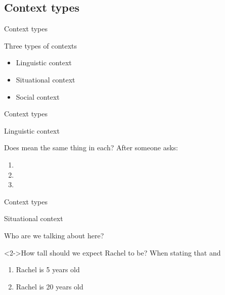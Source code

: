 \documentclass{beamer}
\newcommand{\subonethree}{Context types}
\begin{document}
    \subsection{\subonethree}
      \begin{frame}{\subonethree}
        \begin{block}{Three types of contexts}
          \begin{itemize}
            \item Linguistic context
            \item Situational context
            \item Social context
          \end{itemize}
        \end{block}
      \end{frame}

      \begin{frame}{\subonethree}
        \begin{alertblock}{Linguistic context}
          
        \end{alertblock}
        \begin{block}{Does  mean the same thing in each?}
          After someone asks:
          \begin{enumerate}
            \item {}
            \item {}
            \item {}
          \end{enumerate}
        \end{block}
      \end{frame}

      \begin{frame}{\subonethree}
        \begin{alertblock}{Situational context}
          
        \end{alertblock}
        \begin{block}{Who are we talking about here?}
        \end{block}
        \begin{block}<2->{How tall should we expect Rachel to be?}
          When stating that  and
          \begin{enumerate}
            \item Rachel is 5 years old
            \item Rachel is 20 years old
          \end{enumerate}
        \end{block}
      \end{frame}
\end{document}
